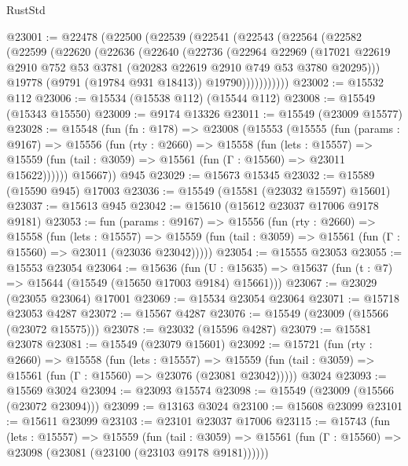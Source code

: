 \begin{lexlean}{RustStd}
\begin{coremodule}
@23001 := @22478
    (@22500
      (@22539
        (@22541
          (@22543
            (@22564
              (@22582
                (@22599
                  (@22620
                    (@22636
                      (@22640
                        (@22736
                          (@22964
                            @22969
                            (@17021
                              @22619
                              @2910
                              @752
                              @53
                              @3781
                              (@20283 @22619 @2910 @749 @53 @3780 @20295)))
                          @19778
                          (@9791 (@19784 @931 @18413))
                          @19790)))))))))))
@23002 := @15532 @112
@23006 := @15534 (@15538 @112) (@15544 @112)
@23008 := @15549 (@15343 @15550)
@23009 := @9174 @13326
@23011 := @15549 (@23009 @15577)
@23028 := @15548
    (fun (fn : @178) =>
    @23008
      (@15553
        (@15555
          (fun (params : @9167) =>
          @15556
            (fun (rty : @2660) =>
            @15558
              (fun (lets : @15557) =>
              @15559 (fun (tail : @3059) => @15561 (fun (Γ : @15560) => @23011 @15622))))))
        @15667))
    @945
@23029 := @15673 @15345
@23032 := @15589 (@15590 @945) @17003
@23036 := @15549 (@15581 (@23032 @15597) @15601)
@23037 := @15613 @945
@23042 := @15610 (@15612 @23037 @17006 @9178 @9181)
@23053 := fun (params : @9167) =>
  @15556
    (fun (rty : @2660) =>
    @15558
      (fun (lets : @15557) =>
      @15559 (fun (tail : @3059) => @15561 (fun (Γ : @15560) => @23011 (@23036 @23042)))))
@23054 := @15555 @23053
@23055 := @15553 @23054
@23064 := @15636
    (fun (U : @15635) => @15637 (fun (t : @7) => @15644 (@15549 (@15650 @17003 @9184) @15661)))
@23067 := @23029 (@23055 @23064) @17001
@23069 := @15534 @23054 @23064
@23071 := @15718 @23053 @4287
@23072 := @15567 @4287
@23076 := @15549 (@23009 (@15566 (@23072 @15575)))
@23078 := @23032 (@15596 @4287)
@23079 := @15581 @23078
@23081 := @15549 (@23079 @15601)
@23092 := @15721
    (fun (rty : @2660) =>
    @15558
      (fun (lets : @15557) =>
      @15559 (fun (tail : @3059) => @15561 (fun (Γ : @15560) => @23076 (@23081 @23042)))))
    @3024
@23093 := @15569 @3024
@23094 := @23093 @15574
@23098 := @15549 (@23009 (@15566 (@23072 @23094)))
@23099 := @13163 @3024
@23100 := @15608 @23099
@23101 := @15611 @23099
@23103 := @23101 @23037 @17006
@23115 := @15743
    (fun (lets : @15557) =>
    @15559
      (fun (tail : @3059) =>
      @15561 (fun (Γ : @15560) => @23098 (@23081 (@23100 (@23103 @9178 @9181))))))

\end{coremodule}
\end{lexlean}
